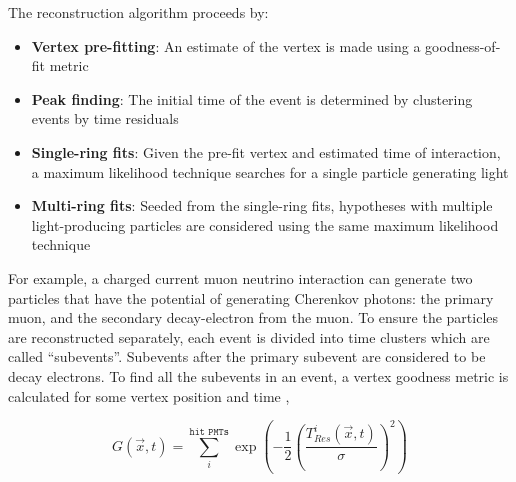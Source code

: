 

The \fq reconstruction algorithm proceeds by:
\begin{itemize}
\item \textbf{Vertex pre-fitting}: An estimate of the vertex is made using a goodness-of-fit metric
\item \textbf{Peak finding}: The initial time of the event is determined by clustering events by time residuals
\item \textbf{Single-ring fits}: Given the pre-fit vertex and estimated time of interaction, a maximum likelihood technique searches for a single particle generating light
\item \textbf{Multi-ring fits}: Seeded from the single-ring fits, hypotheses with multiple light-producing particles are considered using the same maximum likelihood technique
\end{itemize}

  For example, a charged current muon neutrino interaction can generate two particles that have the potential of generating Cherenkov photons: the primary muon, and the secondary decay-electron from the muon. To ensure the particles are reconstructed separately, each event is divided into time clusters which are called ``subevents''. Subevents after the primary subevent are considered to be decay electrons. To find all the subevents in an event, a vertex goodness metric is calculated for some vertex position  and time ,


\begin{equation}
  G(\vec{x},t) = \sum^{\texttt{hit PMTs}}_{i} \exp \left( - \frac{1}{2} \left( \frac{T_{Res}^{i}(\vec{x},t)}{\sigma} \right)^{2} \right)
\end{equation}

